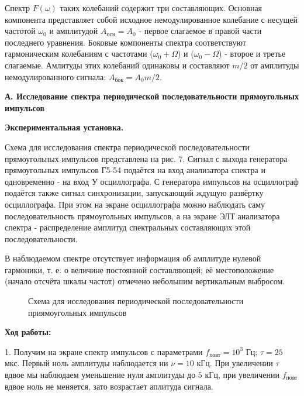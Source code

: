 \documentclass[14pt]{article}
\begin{document}
Спектр $F(\omega)$ таких колебаний содержит три составляющих. Основная компонента представляет собой исходное немодулированное колебание с несущей частотой $\omega_0$ и амплитудой $A_{\text{осн}} = A_0$ - первое слагаемое в правой части последнего уравнения. Боковые компоненты спектра соответствуют гармоническим колебаниям с частотами 
($\omega_0 + \Omega$) и ($\omega_0 - \Omega$) - второе и третье слагаемые. Амлитуды этих колебаний одинаковы и составляют $m/2$ от амплитуды немодулированного сигнала:
$A_{\text{бок}} = A_0m/2$.

\newpage
\textbf{А. Исследование спектра периодической последовательности прямоугольных импульсов}

\textbf{Экспериментальная установка.} 

Схема для исследования спектра периодической последовательности прямоугольных импульсов представлена на рис. 7. Сигнал с выхода генератора прямоугольных импульсов Г5-54 подаётся на вход анализатора спектра и одновременно - на вход У осциллографа. С генератора импульсов на осциллограф подаётся также сигнал синхронизации, запускающий ждущую развёртку осциллографа. При этом на экране осциллографа можно наблюдать саму последовательность прямоугольных импульсов, а на экране ЭЛТ анализатора спектра - распределение амплитуд спектральных составляющих этой последовательности.

В наблюдаемом спектре отсутствует информация об амплитуде нулевой гармоники, т. е. о величине постоянной составляющей; её местоположение (начало отсчёта шкалы частот) отмечено небольшим вертикальным выбросом.

\begin{figure}[h!]
	\caption{Схема для исследования периодической последовательности приямоугольных импульсов}
	\label{fig:image}
\end{figure}

\vspace{1cm}
\textbf{Ход работы:}

1. Получим на экране спектр импульсов с параметрами $f_{\text{повт}} = 10^3$ Гц; $\tau = 25$ мкс. Первый ноль амплитуды наблюдается ни $\nu = 10$ кГц. При увеличении $\tau$ вдвое мы наблюдаем уменьшение нуля амплитуды до $5$ кГц, при увеличении $f_{\text{повт}}$ вдвое ноль не меняется, зато возрастает аплитуда сигнала.
\end{document}
